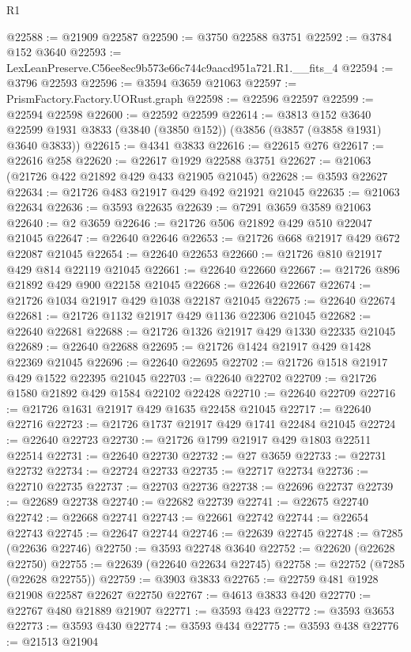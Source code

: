 \begin{lexlean}{R1}
\begin{coremodule}
@22588 := @21909 @22587
@22590 := @3750 @22588 @3751
@22592 := @3784 @152 @3640
@22593 := LexLeanPreserve.C56ee8ec9b573e66c744c9aacd951a721.R1.__fits_4
@22594 := @3796 @22593
@22596 := @3594 @3659 @21063
@22597 := PrismFactory.Factory.UORust.graph
@22598 := @22596 @22597
@22599 := @22594 @22598
@22600 := @22592 @22599
@22614 := @3813
    @152
    @3640
    @22599
    @1931
    @3833
    (@3840 (@3850 @152))
    (@3856 (@3857 (@3858 @1931) @3640 @3833))
@22615 := @4341 @3833
@22616 := @22615 @276
@22617 := @22616 @258
@22620 := @22617 @1929 @22588 @3751
@22627 := @21063 (@21726 @422 @21892 @429 @433 @21905 @21045)
@22628 := @3593 @22627
@22634 := @21726 @483 @21917 @429 @492 @21921 @21045
@22635 := @21063 @22634
@22636 := @3593 @22635
@22639 := @7291 @3659 @3589 @21063
@22640 := @2 @3659
@22646 := @21726 @506 @21892 @429 @510 @22047 @21045
@22647 := @22640 @22646
@22653 := @21726 @668 @21917 @429 @672 @22087 @21045
@22654 := @22640 @22653
@22660 := @21726 @810 @21917 @429 @814 @22119 @21045
@22661 := @22640 @22660
@22667 := @21726 @896 @21892 @429 @900 @22158 @21045
@22668 := @22640 @22667
@22674 := @21726 @1034 @21917 @429 @1038 @22187 @21045
@22675 := @22640 @22674
@22681 := @21726 @1132 @21917 @429 @1136 @22306 @21045
@22682 := @22640 @22681
@22688 := @21726 @1326 @21917 @429 @1330 @22335 @21045
@22689 := @22640 @22688
@22695 := @21726 @1424 @21917 @429 @1428 @22369 @21045
@22696 := @22640 @22695
@22702 := @21726 @1518 @21917 @429 @1522 @22395 @21045
@22703 := @22640 @22702
@22709 := @21726 @1580 @21892 @429 @1584 @22102 @22428
@22710 := @22640 @22709
@22716 := @21726 @1631 @21917 @429 @1635 @22458 @21045
@22717 := @22640 @22716
@22723 := @21726 @1737 @21917 @429 @1741 @22484 @21045
@22724 := @22640 @22723
@22730 := @21726 @1799 @21917 @429 @1803 @22511 @22514
@22731 := @22640 @22730
@22732 := @27 @3659
@22733 := @22731 @22732
@22734 := @22724 @22733
@22735 := @22717 @22734
@22736 := @22710 @22735
@22737 := @22703 @22736
@22738 := @22696 @22737
@22739 := @22689 @22738
@22740 := @22682 @22739
@22741 := @22675 @22740
@22742 := @22668 @22741
@22743 := @22661 @22742
@22744 := @22654 @22743
@22745 := @22647 @22744
@22746 := @22639 @22745
@22748 := @7285 (@22636 @22746)
@22750 := @3593 @22748 @3640
@22752 := @22620 (@22628 @22750)
@22755 := @22639 (@22640 @22634 @22745)
@22758 := @22752 (@7285 (@22628 @22755))
@22759 := @3903 @3833
@22765 := @22759 @481 @1928 @21908 @22587 @22627 @22750
@22767 := @4613 @3833 @420
@22770 := @22767 @480 @21889 @21907
@22771 := @3593 @423
@22772 := @3593 @3653
@22773 := @3593 @430
@22774 := @3593 @434
@22775 := @3593 @438
@22776 := @21513 @21904

\end{coremodule}
\end{lexlean}
